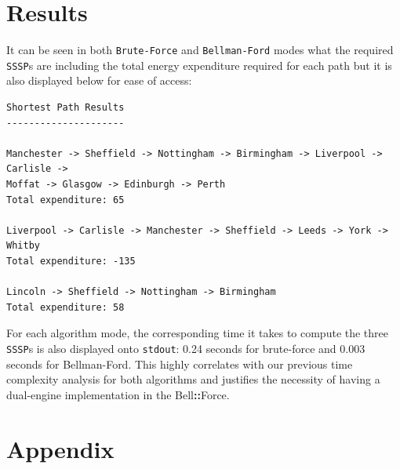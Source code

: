 \documentclass[11pt]{article}
\newcommand{\bellforce}{Bell\hspace*{1.61803398875pt}\textbf{::}\hspace*{1.61803398875pt}Force}
\begin{document}
\section{Results}

It can be seen in both \texttt{Brute-Force} and \texttt{Bellman-Ford} modes what the required \texttt{SSSP}s are including the total energy expenditure required for each path but it is also displayed below for ease of access: 

\begin{verbatim}
Shortest Path Results
---------------------

Manchester -> Sheffield -> Nottingham -> Birmingham -> Liverpool -> Carlisle -> 
Moffat -> Glasgow -> Edinburgh -> Perth
Total expenditure: 65

Liverpool -> Carlisle -> Manchester -> Sheffield -> Leeds -> York -> Whitby
Total expenditure: -135

Lincoln -> Sheffield -> Nottingham -> Birmingham
Total expenditure: 58
\end{verbatim}
For each algorithm mode, the corresponding time it takes to compute the three \texttt{SSSP}s is also displayed onto \texttt{stdout}: 0.24 seconds for brute-force and 0.003 seconds for Bellman-Ford. This highly correlates with our previous time complexity analysis for both algorithms and justifies the necessity of having a dual-engine implementation in the \bellforce{}.



\section{Appendix}
\end{document}

